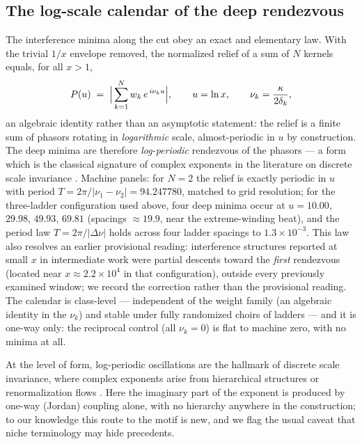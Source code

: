 \documentclass[11pt,a4paper]{article}
\begin{document}
\subsection{The log-scale calendar of the deep rendezvous}
\label{sec:calendar}

The interference minima along the cut obey an exact and elementary law.
With the trivial $1/x$ envelope removed, the normalized relief of a sum
of $N$ kernels equals, for all $x > 1$,
\begin{equation}
P(u) \;=\; \Bigl|\,\sum_{k=1}^{N} w_k\, e^{\,i\nu_k u}\Bigr|,
\qquad u = \ln x,\qquad \nu_k = \frac{\kappa}{2\delta_k},
\label{eq:phasors}
\end{equation}
an algebraic identity rather than an asymptotic statement: the relief is
a finite sum of phasors rotating in \emph{logarithmic} scale,
almost-periodic in $u$ by construction. The deep minima are therefore
\emph{log-periodic} rendezvous of the phasors --- a form which is the
classical signature of complex exponents in the literature on discrete
scale invariance \cite{Derrida1984,Sornette1998}. Machine panels: for
$N = 2$ the relief is exactly periodic in $u$ with period
$T = 2\pi/|\nu_1 - \nu_2| = 94.247780$, matched to grid resolution; for
the three-ladder configuration used above, four deep minima occur at
$u = 10.00$, $29.98$, $49.93$, $69.81$ (spacings $\approx 19.9$, near
the extreme-winding beat), and the period law $T = 2\pi/|\Delta\nu|$
holds across four ladder spacings to $1.3\times10^{-3}$. This law also
resolves an earlier provisional reading: interference structures
reported at small $x$ in intermediate work were partial descents toward
the \emph{first} rendezvous (located near $x \approx 2.2\times10^{4}$ in
that configuration), outside every previously examined window; we record
the correction rather than the provisional reading. The calendar is
class-level --- independent of the weight family (an algebraic identity
in the $\nu_k$) and stable under fully randomized choirs of ladders ---
and it is one-way only: the reciprocal control (all $\nu_k = 0$) is flat
to machine zero, with no minima at all.

At the level of form, log-periodic oscillations are the hallmark of
discrete scale invariance, where complex exponents arise from
hierarchical structures or renormalization flows
\cite{Sornette1998,Derrida1984}. Here the imaginary part of the exponent
is produced by one-way (Jordan) coupling alone, with no hierarchy
anywhere in the construction; to our knowledge this route to the motif
is new, and we flag the usual caveat that niche terminology may hide
precedents.
\end{document}
